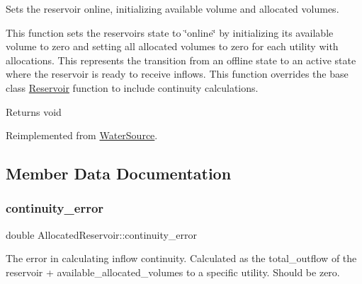 Sets the reservoir online, initializing available volume and allocated volumes. 

This function sets the reservoir\textquotesingle{}s state to \char`\"{}online\char`\"{} by initializing its available volume to zero and setting all allocated volumes to zero for each utility with allocations. This represents the transition from an offline state to an active state where the reservoir is ready to receive inflows. This function overrides the base class {\ttfamily \mbox{\hyperlink{classReservoir}{Reservoir}}} function to include continuity calculations.

\begin{DoxyReturn}{Returns}
void 
\end{DoxyReturn}


Reimplemented from \mbox{\hyperlink{classWaterSource_aaa55dc6e14ff184380300147b53c56ec}{Water\+Source}}.



\subsection{Member Data Documentation}
\mbox{\label{classAllocatedReservoir_ae34d7123ff096d676609e32ba4b83e47}} 
\subsubsection{\texorpdfstring{continuity\+\_\+error}{continuity\_error}}
{\footnotesize\ttfamily double Allocated\+Reservoir\+::continuity\+\_\+error\hspace{0.3cm}{\ttfamily [protected]}}



The error in calculating inflow continuity. Calculated as the total\+\_\+outflow of the reservoir + available\+\_\+allocated\+\_\+volumes to a specific utility. Should be zero. 

\mbox{\label{classAllocatedReservoir_af6a1924f60de19b7f77781af0419c39b}} 
